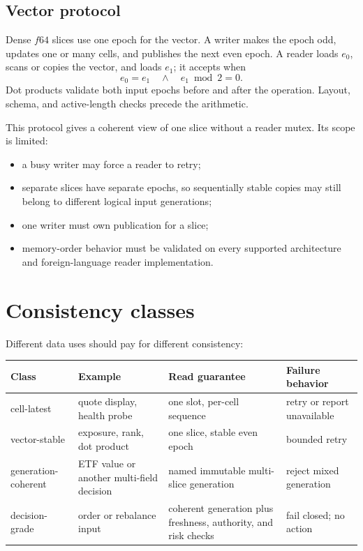 \documentclass{strategynet-journal}
\begin{document}
\begin{SNcolumns}
\section{Vector protocol}

Dense \(f64\) slices use one epoch for the vector.  A writer makes the epoch
odd, updates one or many cells, and publishes the next even epoch.  A reader
loads \(e_0\), scans or copies the vector, and loads \(e_1\); it accepts when
\[
  e_0=e_1\quad\land\quad e_1\bmod 2=0.
\]
Dot products validate both input epochs before and after the operation.
Layout, schema, and active-length checks precede the arithmetic.

This protocol gives a coherent view of one slice without a reader mutex.  Its
scope is limited:
\begin{itemize}
  \item a busy writer may force a reader to retry;
  \item separate slices have separate epochs, so sequentially stable copies may
        still belong to different logical input generations;
  \item one writer must own publication for a slice;
  \item memory-order behavior must be validated on every supported
        architecture and foreign-language reader implementation.
\end{itemize}

\end{SNcolumns}

\section{Consistency classes}

Different data uses should pay for different consistency:
\begin{center}
\begin{tabularx}{\textwidth}{@{}p{}p{}X X@{}}
\toprule
Class & Example & Read guarantee & Failure behavior \\
\midrule
cell-latest & quote display, health probe &
one slot, per-cell sequence & retry or report unavailable \\
vector-stable & exposure, rank, dot product &
one slice, stable even epoch & bounded retry \\
generation-coherent & ETF value or another multi-field decision &
named immutable multi-slice generation & reject mixed generation \\
decision-grade & order or rebalance input &
coherent generation plus freshness, authority, and risk checks &
fail closed; no action \\
\bottomrule
\end{tabularx}
\end{center}
\end{document}

